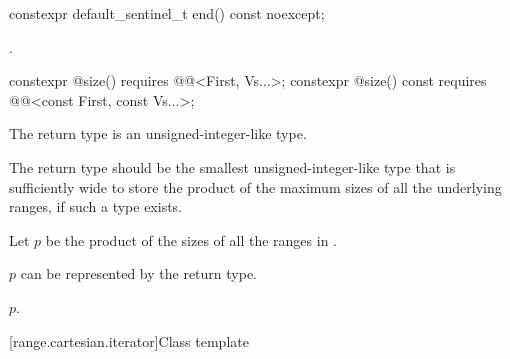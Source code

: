 %
\begin{itemdecl}
constexpr default_sentinel_t end() const noexcept;
\end{itemdecl}

\begin{itemdescr}
\pnum
\returns
{}.
\end{itemdescr}

%
\begin{itemdecl}
constexpr @\seebelow@ size()
  requires @@<First, Vs...>;
constexpr @\seebelow@ size() const
  requires @@<const First, const Vs...>;
\end{itemdecl}

\begin{itemdescr}
\pnum
The return type is an  unsigned-integer-like type.

\pnum
\recommended
The return type should be the smallest unsigned-integer-like type
that is sufficiently wide to store the product of the maximum sizes of
all the underlying ranges, if such a type exists.

\pnum
Let $p$ be the product of the sizes of all the ranges in .

\pnum
\expects
$p$ can be represented by the return type.

\pnum
\returns
$p$.
\end{itemdescr}

[range.cartesian.iterator]{Class template }

